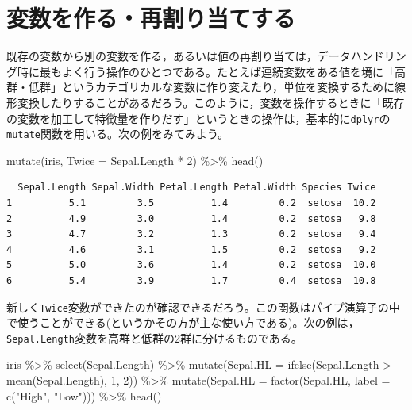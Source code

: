 \documentclass[
  a4paper,
]{ltjsbook}
\newenvironment{Shaded}{\begin{snugshade}}{\end{snugshade}}
\newcommand{\AttributeTok}[1]{\textcolor[rgb]{0.40,0.45,0.13}{#1}}
\newcommand{\DecValTok}[1]{\textcolor[rgb]{0.68,0.00,0.00}{#1}}
\newcommand{\FunctionTok}[1]{\textcolor[rgb]{0.28,0.35,0.67}{#1}}
\newcommand{\NormalTok}[1]{\textcolor[rgb]{0.00,0.23,0.31}{#1}}
\newcommand{\SpecialCharTok}[1]{\textcolor[rgb]{0.37,0.37,0.37}{#1}}
\newcommand{\StringTok}[1]{\textcolor[rgb]{0.13,0.47,0.30}{#1}}
\begin{document}
\section{変数を作る・再割り当てする}\label{ux5909ux6570ux3092ux4f5cux308bux518dux5272ux308aux5f53ux3066ux3059ux308b}

既存の変数から別の変数を作る，あるいは値の再割り当ては，データハンドリング時に最もよく行う操作のひとつである。たとえば連続変数をある値を境に「高群・低群」というカテゴリカルな変数に作り変えたり，単位を変換するために線形変換したりすることがあるだろう。このように，変数を操作するときに「既存の変数を加工して特徴量を作りだす」というときの操作は，基本的に\texttt{dplyr}の\texttt{mutate}関数を用いる。次の例をみてみよう。

\begin{Shaded}
\begin{Highlighting}[]
\FunctionTok{mutate}\NormalTok{(iris, }\AttributeTok{Twice =}\NormalTok{ Sepal.Length }\SpecialCharTok{*} \DecValTok{2}\NormalTok{) }\SpecialCharTok{\%\textgreater{}\%} \FunctionTok{head}\NormalTok{()}
\end{Highlighting}
\end{Shaded}

\begin{verbatim}
  Sepal.Length Sepal.Width Petal.Length Petal.Width Species Twice
1          5.1         3.5          1.4         0.2  setosa  10.2
2          4.9         3.0          1.4         0.2  setosa   9.8
3          4.7         3.2          1.3         0.2  setosa   9.4
4          4.6         3.1          1.5         0.2  setosa   9.2
5          5.0         3.6          1.4         0.2  setosa  10.0
6          5.4         3.9          1.7         0.4  setosa  10.8
\end{verbatim}

新しく\texttt{Twice}変数ができたのが確認できるだろう。この関数はパイプ演算子の中で使うことができる(というかその方が主な使い方である)。次の例は，\texttt{Sepal.Length}変数を高群と低群の2群に分けるものである。

\begin{Shaded}
\begin{Highlighting}[]
\NormalTok{iris }\SpecialCharTok{\%\textgreater{}\%}
  \FunctionTok{select}\NormalTok{(Sepal.Length) }\SpecialCharTok{\%\textgreater{}\%}
  \FunctionTok{mutate}\NormalTok{(}\AttributeTok{Sepal.HL =} \FunctionTok{ifelse}\NormalTok{(Sepal.Length }\SpecialCharTok{\textgreater{}} \FunctionTok{mean}\NormalTok{(Sepal.Length), }\DecValTok{1}\NormalTok{, }\DecValTok{2}\NormalTok{)) }\SpecialCharTok{\%\textgreater{}\%}
  \FunctionTok{mutate}\NormalTok{(}\AttributeTok{Sepal.HL =} \FunctionTok{factor}\NormalTok{(Sepal.HL, }\AttributeTok{label =} \FunctionTok{c}\NormalTok{(}\StringTok{"High"}\NormalTok{, }\StringTok{"Low"}\NormalTok{))) }\SpecialCharTok{\%\textgreater{}\%}
  \FunctionTok{head}\NormalTok{()}
\end{Highlighting}
\end{Shaded}
\end{document}
